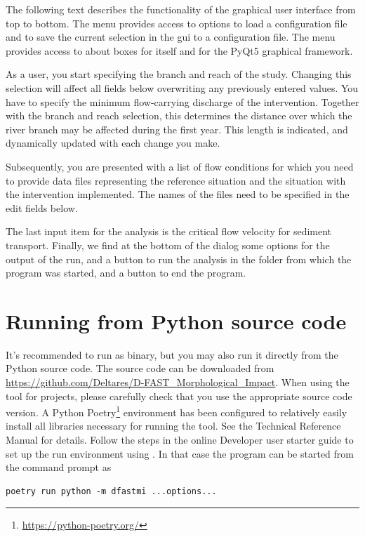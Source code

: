The following text describes the functionality of the graphical user interface from top to bottom.
The  menu provides access to options to load a configuration file and to save the current selection in the gui to a configuration file.
The  menu provides access to about boxes for \dfastmi itself and for the PyQt5 graphical framework.

As a user, you start specifying the branch and reach of the study.
Changing this selection will affect all fields below overwriting any previously entered values.
You have to specify the minimum flow-carrying discharge of the intervention.
Together with the branch and reach selection, this determines the distance over which the river branch may be affected during the first year.
This length  is indicated, and dynamically updated with each change you make.

Subsequently, you are presented with a list of flow conditions for which you need to provide data files representing the reference situation and the situation with the intervention implemented.
The names of the files need to be specified in the edit fields below.

The last input item for the analysis is the critical flow velocity  for sediment transport.
Finally, we find at the bottom of the dialog some options for the output of the \dfastmi run, and a button to run the analysis in the folder from which the program was started, and a button to end the program.

\section{Running from Python source code}
It's recommended to run \dfastmi as binary, but you may also run it directly from the Python source code.
The source code can be downloaded from \url{https://github.com/Deltares/D-FAST_Morphological_Impact}.
When using the tool for projects, please carefully check that you use the appropriate source code version.
A Python Poetry\footnote{\url{https://python-poetry.org/}} environment has been configured to relatively easily install all libraries necessary for running the tool.
See the \dfastmi Technical Reference Manual for details.
Follow the steps in the online Developer user starter guide to set up the run environment using .
In that case the program can be started from the command prompt as

\begin{Verbatim}
poetry run python -m dfastmi ...options...
\end{Verbatim}

